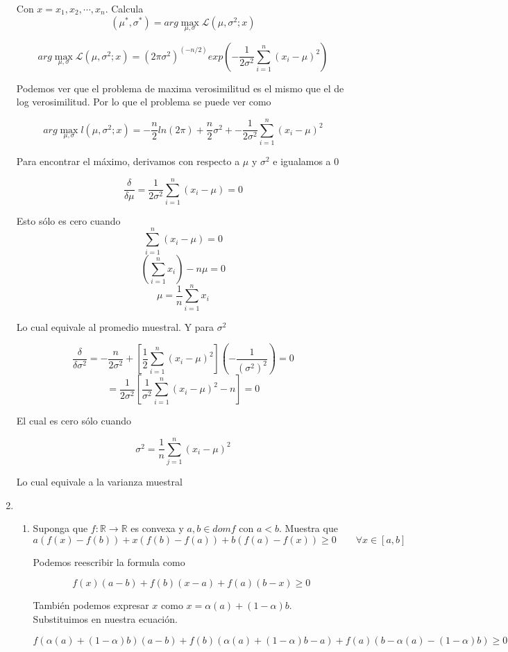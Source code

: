 \documentclass{article}
\begin{document}
\begin{enumerate}
Con $x = x_1, x_2, \cdots, x_n$. Calcula
$$(\mu^*, \sigma^*) = arg \max_{\mu, \sigma} \mathcal{L}(\mu, \sigma^2; x)$$

$$arg \max_{\mu, \sigma} \mathcal{L}(\mu, \sigma^2; x) = (2\pi\sigma^2)^{(-n/2)}exp\left(-\frac{1}{2\sigma^2}\sum_{i=1}^{n}(x_i-\mu)^2\right)$$

Podemos ver que el problema de maxima verosimilitud es el mismo que el de log verosimilitud. Por lo que el problema se puede ver como

$$arg \max_{\mu, \sigma} l(\mu, \sigma^2; x) = -\frac{n}{2}ln(2\pi) + \frac{n}{2}\sigma^2 + -\frac{1}{2\sigma^2}\sum_{i=1}^{n}(x_i-\mu)^2$$

Para encontrar el máximo, derivamos con respecto a $\mu$ y $\sigma^2$ e igualamos a 0

$$\frac{\delta}{\delta \mu} = \frac{1}{2\sigma^2}\sum_{i=1}^{n}(x_i-\mu) = 0$$

Esto sólo es cero cuando
$$\sum_{i=1}^{n}(x_i-\mu) = 0$$
$$\left(\sum_{i=1}^{n}x_i\right)-n\mu = 0$$
$$\mu = \frac{1}{n}\sum_{i=1}^{n}x_i$$

Lo cual equivale al promedio muestral. Y para $\sigma^2$

$$\frac{\delta}{\delta \sigma^2} = -\frac{n}{2\sigma^2} +\left[ \frac{1}{2}\sum_{i=1}^{n}(x_i-\mu)^2\right]\left( -\frac{1}{(\sigma^2)^2}\right) = 0$$
$$= \frac{1}{2\sigma^2}\left[ \frac{1}{\sigma^2}\sum_{i=1}^{n}(x_i-\mu)^2 - n\right] = 0$$

El cual es cero sólo cuando

$$\sigma^2 = \frac{1}{n}\sum_{j=1}^{n}(x_i - \mu)^2$$

Lo cual equivale a la varianza muestral

\pagebreak
\item
\begin{enumerate}
\item Suponga que $f : \mathbb{R} \rightarrow \mathbb{R}$ es convexa y $a, b \in dom f$ con $a < b$. Muestra que 
$$ a(f(x) - f(b)) + x(f(b) - f(a)) + b(f(a) - f(x)) \geq 0 \qquad \forall x \in [a, b]$$

Podemos reescribir la formula como

$$ f(x)(a - b) + f(b)(x - a) + f(a)(b - x) \geq 0$$

También podemos expresar $x$ como $x = \alpha (a) + (1-\alpha)b$. Substituimos en nuestra ecuación.

$$ f(\alpha (a) + (1-\alpha)b)(a - b) + f(b)(\alpha (a) + (1-\alpha)b - a) + f(a)(b - \alpha (a) - (1-\alpha)b) \geq 0$$


\end{enumerate}
\end{enumerate}
\end{document}
